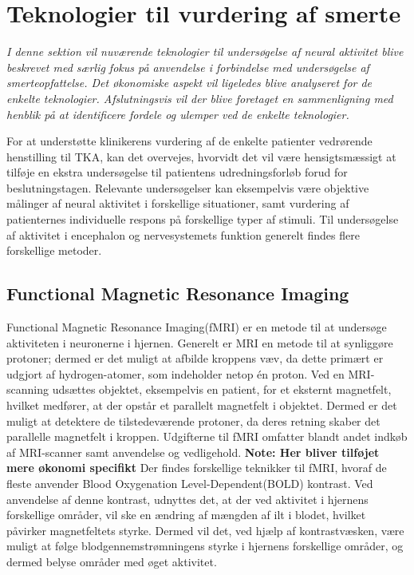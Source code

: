 \section{Teknologier til vurdering af smerte} %
\textit{I denne sektion vil nuværende teknologier til undersøgelse af neural aktivitet blive beskrevet med særlig fokus på anvendelse i forbindelse med undersøgelse af smerteopfattelse. Det økonomiske aspekt vil ligeledes blive analyseret for de enkelte teknologier. Afslutningsvis vil der blive foretaget en sammenligning med henblik på at identificere fordele og ulemper ved de enkelte teknologier.}

For at understøtte klinikerens vurdering af de enkelte patienter vedrørende henstilling til TKA, kan det overvejes, hvorvidt det vil være hensigtsmæssigt at tilføje en ekstra undersøgelse til patientens udredningsforløb forud for beslutningstagen. Relevante undersøgelser kan eksempelvis være objektive målinger af neural aktivitet i forskellige situationer, samt vurdering af patienternes individuelle respons på forskellige typer af stimuli. Til undersøgelse af aktivitet i encephalon og nervesystemets funktion generelt findes flere forskellige metoder.

\subsection{Functional Magnetic Resonance Imaging}
Functional Magnetic Resonance Imaging(fMRI) er en metode til at undersøge aktiviteten i neuronerne i hjernen.
Generelt er MRI en metode til at synliggøre protoner; dermed er det muligt at afbilde kroppens væv, da dette primært er udgjort af hydrogen-atomer, som indeholder netop én proton.     
Ved en MRI-scanning udsættes objektet, eksempelvis en patient, for et eksternt magnetfelt, hvilket medfører, at der opstår et parallelt magnetfelt i objektet. Dermed er det muligt at detektere de tilstedeværende protoner, da deres retning skaber det parallelle magnetfelt i kroppen. \citep{Wals2009} Udgifterne til fMRI omfatter blandt andet indkøb af MRI-scanner samt anvendelse og vedligehold. \textbf{Note: Her bliver tilføjet mere økonomi specifikt} 
Der findes forskellige teknikker til fMRI, hvoraf de fleste anvender Blood Oxygenation Level-Dependent(BOLD) kontrast. Ved anvendelse af denne kontrast, udnyttes det, at der ved aktivitet i hjernens forskellige områder, vil ske en ændring af mængden af ilt i blodet, hvilket påvirker magnetfeltets styrke. Dermed vil det, ved hjælp af kontrastvæsken, være muligt at følge blodgennemstrømningens styrke i hjernens forskellige områder, og dermed belyse områder med øget aktivitet. \citep{Wals2009} 

